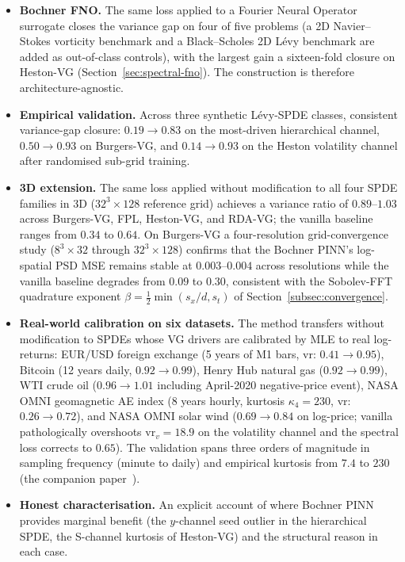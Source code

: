 \documentclass[review,12pt]{elsarticle}
\begin{document}
\begin{itemize}
\item \textbf{Bochner FNO.} The same loss applied to a
Fourier Neural Operator surrogate closes the variance gap on four
of five problems (a 2D Navier--Stokes vorticity benchmark and a
Black--Scholes 2D L\'evy benchmark are added as out-of-class
controls), with the largest gain a sixteen-fold closure on
Heston-VG (Section~\ref{sec:spectral-fno}). The construction is
therefore architecture-agnostic.

\item \textbf{Empirical validation.} Across three synthetic L\'evy-SPDE
classes, consistent variance-gap closure: \(0.19 \to 0.83\) on the
most-driven hierarchical channel, \(0.50 \to 0.93\) on Burgers-VG,
and \(0.14 \to 0.93\) on the Heston volatility channel after
randomised sub-grid training.

\item \textbf{3D extension.} The same loss applied without modification
to all four SPDE families in 3D (\(32^3 \times 128\) reference grid)
achieves a variance ratio of \(0.89\)--\(1.03\) across Burgers-VG, FPL,
Heston-VG, and RDA-VG; the vanilla baseline ranges from \(0.34\) to
\(0.64\). On Burgers-VG a four-resolution grid-convergence study
(\(8^3 \times 32\) through \(32^3 \times 128\)) confirms that the
Bochner PINN's log-spatial PSD MSE remains stable at \(0.003\)--\(0.004\)
across resolutions while the vanilla baseline degrades from \(0.09\) to
\(0.30\), consistent with the Sobolev-FFT quadrature exponent
\(\beta = \tfrac12 \min(s_x/d, s_t)\) of Section~\ref{subsec:convergence}.

\item \textbf{Real-world calibration on six datasets.} The method
transfers without modification to SPDEs whose VG drivers are
calibrated by MLE to real log-returns: EUR/USD foreign exchange (5
years of M1 bars, vr: \(0.41 \to 0.95\)), Bitcoin (12 years daily,
\(0.92 \to 0.99\)), Henry Hub natural gas (\(0.92 \to 0.99\)), WTI
crude oil (\(0.96 \to 1.01\) including April-2020 negative-price
event), NASA OMNI geomagnetic AE index (8 years hourly, kurtosis
\(\kappa_4 = 230\), vr: \(0.26 \to 0.72\)), and NASA OMNI solar wind
(\(0.69 \to 0.84\) on log-price; vanilla pathologically overshoots
\(\mathrm{vr}_v = 18.9\) on the volatility channel and the spectral
loss corrects to \(0.65\)). The validation spans three orders of
magnitude in sampling frequency (minute to daily) and empirical
kurtosis from \(7.4\) to \(230\) (the companion paper~\citep{Lipski2026RealWorld}).

\item \textbf{Honest characterisation.} An explicit account of where
Bochner PINN provides marginal benefit (the \(y\)-channel seed
outlier in the hierarchical SPDE, the S-channel kurtosis of Heston-VG)
and the structural reason in each case.
\end{itemize}
\end{document}
